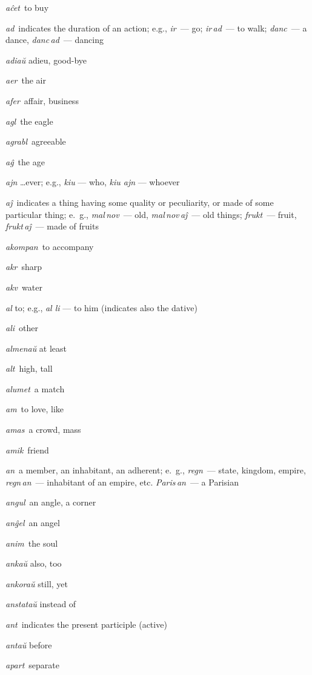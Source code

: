 \begin{landscape}
\begin{multicols}{5}
\begin{outdent}{1em}
\emph{aĉet\,} to buy

\emph{ad\,} indicates the duration of an action; e.g., \emph{ir\,} — go; \emph{ir\,ad\,} — to walk; \emph{danc\,} — a dance, \emph{danc\,ad\,} — dancing

\emph{adiaŭ} adieu, good-bye

\emph{aer\,} the air

\emph{afer\,} affair, business

\emph{agl\,} the eagle

\emph{agrabl\,} agreeable

\emph{aĝ\,} the age

\emph{ajn} \ldots{}ever; e.g., \emph{kiu} — who, \emph{kiu ajn} — whoever

\emph{aĵ\,} indicates a thing having some quality or peculiarity, or made of some particular thing; e.~g., \emph{mal\,nov\,} — old, \emph{mal\,nov\,aĵ\,} — old things; \emph{frukt\,} — fruit, \emph{frukt\,aĵ\,} — made of fruits

\emph{akompan\,} to accompany

\emph{akr\,} sharp

\emph{akv\,} water

\emph{al} to; e.g., \emph{al li} — to him (indicates also the dative)

\emph{ali\,} other

\emph{almenaŭ} at least

\emph{alt\,} high, tall

\emph{alumet\,} a match

\emph{am\,} to love, like

\emph{amas\,} a crowd, mass

\emph{amik\,} friend

\emph{an\,} a member, an inhabitant, an adherent; e.~g., \emph{regn\,} — state, kingdom, empire, \emph{regn\,an\,} — inhabitant of an empire, etc. \emph{Paris\,an\,} — a Parisian

\emph{angul\,} an angle, a corner

\emph{anĝel\,} an angel

\emph{anim\,} the soul

\emph{ankaŭ} also, too

\emph{ankoraŭ} still, yet

\emph{anstataŭ} instead of

\emph{ant\,} indicates the present participle (active)

\emph{antaŭ} before

\emph{apart\,} separate


\end{outdent}
\end{multicols}
\end{landscape}
